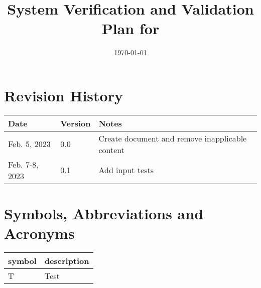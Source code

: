 \documentclass[12pt, titlepage]{article}
\begin{document}
\title{%
  System Verification and Validation Plan for \progname{}}
\author{\authname}
\date{\today}

\maketitle


\section{Revision History}

\begin{tabularx}{\textwidth}{llX}
  \toprule {\bf Date} & {\bf Version} & {\bf Notes}                             \\
  \midrule
  Feb. 5, 2023        & 0.0           & Create document and remove inapplicable
  content                                                                       \\
  Feb. 7-8, 2023      & 0.1           & Add input tests                         \\
  \bottomrule
\end{tabularx}

\newpage

\tableofcontents

\listoftables
{}

\listoffigures
{}

\newpage

\section{Symbols, Abbreviations and Acronyms}

\renewcommand{\arraystretch}{1.2}
\begin{tabular}{l l}
  \toprule
  \textbf{symbol} & \textbf{description} \\
  \midrule
  T               & Test                 \\
  \bottomrule
\end{tabular}\\



\newpage
\end{document}
